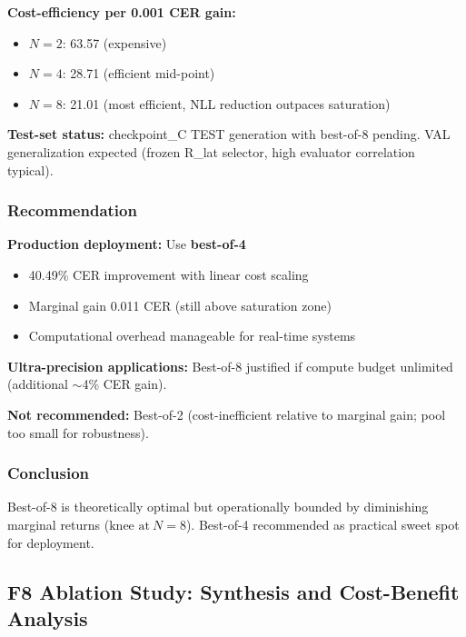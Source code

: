 \documentclass[10.5pt,a4paper]{article}
\begin{document}
\textbf{Cost-efficiency per 0.001 CER gain:}
\begin{itemize}
    \item $N{=}2$: 63.57 (expensive)
    \item $N{=}4$: 28.71 (efficient mid-point)
    \item $N{=}8$: 21.01 (most efficient, NLL reduction outpaces saturation)
\end{itemize}

\textbf{Test-set status:} checkpoint\_C TEST generation with best-of-8 pending. VAL generalization expected (frozen R\_lat selector, high evaluator correlation typical).

\subsubsection{Recommendation}

\textbf{Production deployment:} Use \textbf{best-of-4}
\begin{itemize}
    \item 40.49\% CER improvement with linear cost scaling
    \item Marginal gain 0.011 CER (still above saturation zone)
    \item Computational overhead manageable for real-time systems
\end{itemize}

\textbf{Ultra-precision applications:} Best-of-8 justified if compute budget unlimited (additional $\sim$4\% CER gain).

\textbf{Not recommended:} Best-of-2 (cost-inefficient relative to marginal gain; pool too small for robustness).

\subsubsection{Conclusion}
Best-of-8 is theoretically optimal but operationally bounded by diminishing marginal returns ($\text{knee at}\ N{=}8$). Best-of-4 recommended as practical sweet spot for deployment.

\subsection{F8 Ablation Study: Synthesis and Cost-Benefit Analysis}
\label{sec:f8_ablation_synthesis}
\end{document}
